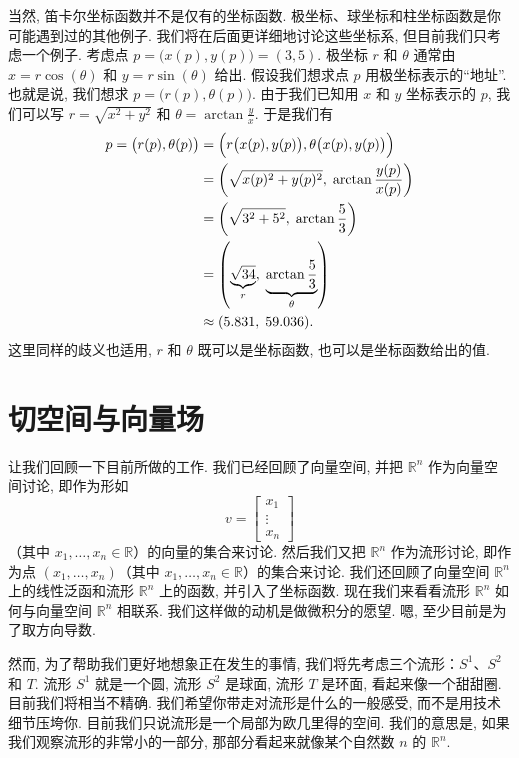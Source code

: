 当然, 笛卡尔坐标函数并不是仅有的坐标函数. 极坐标、球坐标和柱坐标函数是你可能遇到过的其他例子. 我们将在后面更详细地讨论这些坐标系, 但目前我们只考虑一个例子. 考虑点 $p=\bigl(x(p),y(p)\bigr)=(3,5)$. 极坐标 $r$ 和 $\theta$ 通常由 $x=r\cos(\theta)$ 和 $y=r\sin(\theta)$ 给出. 假设我们想求点 $p$ 用极坐标表示的``地址''. 也就是说, 我们想求 $p=\bigl(r(p),\theta(p)\bigr)$.
由于我们已知用 $x$ 和 $y$ 坐标表示的 $p$, 我们可以写 $r=\sqrt{x^2+y^2}$ 和 $\theta=\arctan\frac{y}{x}$. 于是我们有
\begin{align*}
p=\bigl(r(p),\theta(p)\bigr)
&=\Bigl(r\bigl(x(p),y(p)\bigr),\theta\bigl(x(p),y(p)\bigr)\Bigr)\\
&=\left(\sqrt{x(p)^2+y(p)^2},\;\arctan\frac{y(p)}{x(p)}\right)\\
&=\left(\sqrt{3^2+5^2},\;\arctan\frac{5}{3}\right)\\
&=\left(\underbrace{\sqrt{34}}_{r},\;\underbrace{\arctan\frac{5}{3}}_{\theta}\right)\\
&\approx(5.831,\;59.036).
\end{align*}
这里同样的歧义也适用, $r$ 和 $\theta$ 既可以是坐标函数, 也可以是坐标函数给出的值.

\section{切空间与向量场}

让我们回顾一下目前所做的工作. 我们已经回顾了向量空间, 并把 $\mathbb{R}^n$ 作为向量空间讨论, 即作为形如
\[
v=\begin{bmatrix}x_1\\\vdots\\x_n\end{bmatrix}
\]
（其中 $x_1,\ldots,x_n\in\mathbb{R}$）的向量的集合来讨论. 然后我们又把 $\mathbb{R}^n$ 作为流形讨论, 即作为点 $(x_1,\ldots,x_n)$（其中 $x_1,\ldots,x_n\in\mathbb{R}$）的集合来讨论. 我们还回顾了向量空间 $\mathbb{R}^n$ 上的线性泛函和流形 $\mathbb{R}^n$ 上的函数, 并引入了坐标函数. 现在我们来看看流形 $\mathbb{R}^n$ 如何与向量空间 $\mathbb{R}^n$ 相联系. 我们这样做的动机是做微积分的愿望. 嗯, 至少目前是为了取方向导数.

然而, 为了帮助我们更好地想象正在发生的事情, 我们将先考虑三个流形：$S^1$、$S^2$ 和 $T$. 流形 $S^1$ 就是一个圆, 流形 $S^2$ 是球面, 流形 $T$ 是环面, 看起来像一个甜甜圈. 目前我们将相当不精确. 我们希望你带走对流形是什么的一般感受, 而不是用技术细节压垮你. 目前我们只说流形是一个局部为欧几里得的空间. 我们的意思是, 如果我们观察流形的非常小的一部分, 那部分看起来就像某个自然数 $n$ 的 $\mathbb{R}^n$.

